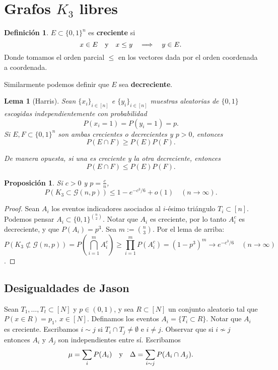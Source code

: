 \documentclass[12pt]{report}
\theoremstyle{plain}
\newtheorem{lemma}[theorem]{Lema}
\newtheorem{proposition}[theorem]{Proposición}
\theoremstyle{definition}
\newtheorem{definition}[theorem]{Definición}
\begin{document}
\section{Grafos $K_3$ libres}

\begin{definition}
    $E \subset \{0,1\}^n$ es \textbf{creciente} si
    \[
    x \in E \quad \text y \quad x \leq y \quad \Longrightarrow \quad y \in E.
    \]
    Donde tomamos el orden parcial $\leq$ en los vectores dada por el orden coordenada a coordenada.

    Similarmente podemos definir que $E$ sea \textbf{decreciente}.

\end{definition}

\begin{lemma}[Harris]
Sean $\{x_i\}_{i \in [n]}$ e $\{y_i\}_{i \in [n]}$ \textit{muestras aleatorias} de $\{0,1\}$ escogidas independientemente con probabilidad
\[
P (x_i = 1) = P (y_i = 1) = p.
\]
Si $E, F \subset \{0,1\}^n$ son ambas crecientes o decrecientes y $p > 0$, entonces
\[
P(E \cap F) \geq P(E) P(F).
\]

De manera opuesta, si una es creciente y la otra decreciente, entonces
\[
    P(E \cap F) \leq P (E) P (F).
\]
\end{lemma}

\begin{proposition}\label{proposicion:probabilidad de que un grafo aleatorio contenga un triangulo}
Si $c > 0$ y $p = \frac c n$,
\[
P (K_3 \subset \mathcal G (n, p)) \leq 1 - e^{- c^3/6} + o(1) \quad (n \to \infty).
\]
\end{proposition}
\begin{proof}
Sean $A_i$ los eventos indicadores asociados al $i$-ésimo triángulo $T_i \subset [n]$. Podemos pensar $A_i \subset \{0,1\}^{\binom n 2}$. Notar que $A_i$ es creciente, por lo tanto $A_i^c$ es decreciente, y que $P (A_i) = p^3$. Sea $m := \binom n 3$. Por el lema de arriba:
\[
P(K_3 \not \subset \mathcal G (n,p)) = P (\bigcap_{i = 1}^m A_i^c) \geq \prod_{i = 1}^m P(A_i^c) = (1- p^3)^m \longrightarrow e^{-c^3 / 6} \quad (n \to \infty)
\].
\end{proof}



\subsection{Desigualdades de Jason}

Sean $ T_1, \ldots, T_t \subset [N]$ y $p \in (0,1)$, y sea $R \subset [N]$ un conjunto aleatorio tal que $P( x \in R) = p_1 , \: x \in [N]$. Definamos los eventos $A_i = \{T_i \subset R\}$. Notar que $A_i$ es creciente. Escribamos $i \sim j$ si $T_i \cap T_j \neq \emptyset$ e $i \neq j$. Observar que si $i \not \sim j$ entonces $A_i$ y $A_j$ son independientes entre sí. Escribamos
\[
\mu = \sum_i P(A_i) \quad \text y \quad \Delta = \sum_{i \sim j} P (A_i \cap A_j).
\]
\end{document}
